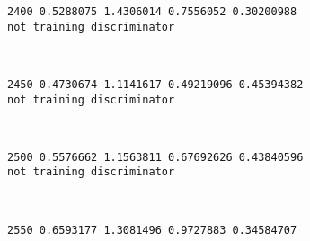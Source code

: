 \documentclass[11pt]{article}
\begin{document}
    \begin{Verbatim}[commandchars=\\\{\}]
2400 0.5288075 1.4306014 0.7556052 0.30200988
not training discriminator

    \end{Verbatim}

    \begin{center}
    \end{center}
    { \hspace*{\fill} \\}
    
    \begin{Verbatim}[commandchars=\\\{\}]
2450 0.4730674 1.1141617 0.49219096 0.45394382
not training discriminator

    \end{Verbatim}

    \begin{center}
    \end{center}
    { \hspace*{\fill} \\}
    
    \begin{Verbatim}[commandchars=\\\{\}]
2500 0.5576662 1.1563811 0.67692626 0.43840596
not training discriminator

    \end{Verbatim}

    \begin{center}
    \end{center}
    { \hspace*{\fill} \\}
    
    \begin{Verbatim}[commandchars=\\\{\}]
2550 0.6593177 1.3081496 0.9727883 0.34584707

    \end{Verbatim}

    \begin{center}
    \end{center}
    { \hspace*{\fill} \\}
    
\end{document}

